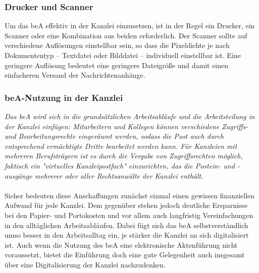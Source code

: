 \subsubsection{Drucker und Scanner}
Um das beA effektiv in der Kanzlei einzusetzen, ist in der Regel ein Drucker, ein Scanner oder eine Kombination aus beiden erforderlich. Der Scanner sollte auf verschiedene Auflösungen einstellbar sein, so dass die Pixeldichte je nach Dokumententyp – Textdatei oder Bilddatei – individuell einstellbar ist. Eine geringere Auflösung bedeutet eine geringere Dateigröße und damit einen einfacheren Versand der Nachrichtenanhänge.

\subsubsection{beA-Nutzung in der Kanzlei}
\textit{Das beA wird sich in die grundsätzlichen Arbeitsabläufe und die Arbeitsteilung in der Kanzlei einfügen: Mitarbeitern und Kollegen können verschiedene Zugriffs- und Bearbeitungsrechte eingeräumt werden, sodass die Post auch durch entsprechend ermächtigte Dritte bearbeitet werden kann. Für Kanzleien mit mehreren Berufsträgern ist es durch die Vergabe von Zugriffsrechten möglich, faktisch ein "virtuelles Kanzleipostfach" einzurichten, das die Postein- und -ausgänge mehrerer oder aller Rechtsanwälte der Kanzlei enthält.} \\
\\
Sicher bedeuten diese Anschaffungen zunächst einmal einen gewissen finanziellen Aufwand für jede Kanzlei. Dem gegenüber stehen jedoch deutliche Ersparnisse bei den Papier- und Portokosten und vor allem auch langfristig Vereinfachungen in den alltäglichen Arbeitsabläufen. Dabei fügt sich das beA selbstverständlich umso besser in den Arbeitsalltag ein, je stärker die Kanzlei an sich digitalisiert ist. Auch wenn die Nutzung des beA eine elektronische Aktenführung nicht voraussetzt, bietet die Einführung doch eine gute Gelegenheit auch insgesamt über eine Digitalisierung der Kanzlei nachzudenken.

